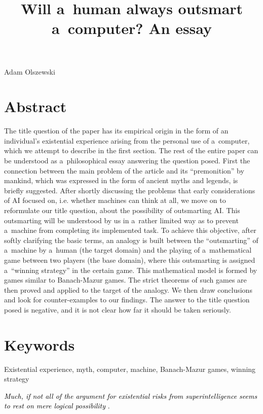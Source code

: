 

\title{Will a~human always outsmart a~computer? An essay}
\maketitle

Adam Olszewski


\section{Abstract}
The title question of the paper has its empirical origin in the form of an individual's existential experience arising from the personal use of a~computer, which we attempt to describe in the first section. The rest of the entire paper can be understood as a~philosophical essay answering the question posed. First the connection between the main problem of the article and its ``premonition'' by mankind, which was expressed in the form of ancient myths and legends, is briefly suggested. After shortly discussing the problems that early considerations of AI focused on, i.e. whether machines can think at all, we move on to reformulate our title question, about the possibility of outsmarting AI. This outsmarting will be understood by us in a~rather limited way as to prevent a~machine from completing its implemented task. To achieve this objective, after softly clarifying the basic terms, an analogy is built between the ``outsmarting'' of a~machine by a~human (the target domain) and the playing of a~mathematical game between two players (the base domain), where this outsmarting is assigned a~``winning strategy'' in the certain game. This mathematical model is formed by games similar to Banach-Mazur games. The strict theorems of such games are then proved and applied to the target of the analogy. We then draw conclusions and look for counter-examples to our findings. The answer to the title question posed is negative, and it is not clear how far it should be taken seriously.

\section{Keywords}
Existential experience, myth, computer, machine, Banach-Mazur games, winning strategy

\textit{\textcolor{black}{Much, if not all of the argument for existential risks from superintelligence seems to rest on mere logical possibility}}
\parencite[][]{dubhashi_ai_2017}%
\textcolor{black}{.}

